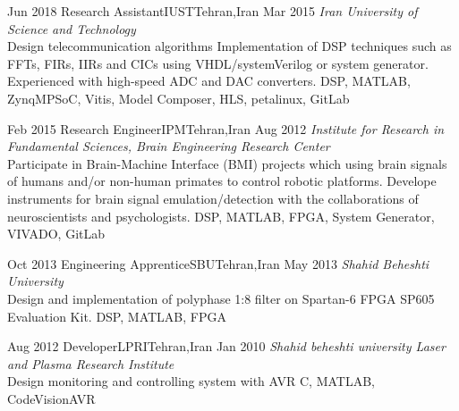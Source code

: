 
\begin{experiences}
  \experience
  {Jun 2018} {Research Assistant}{IUST}{Tehran,Iran}
  {Mar 2015} {
    \emph{Iran University of Science and Technology}\\
    Design telecommunication algorithms
    Implementation of DSP techniques such as FFTs, FIRs,
    IIRs and CICs using VHDL/systemVerilog or system generator.
    Experienced with high-speed ADC and DAC converters.
  }
  {DSP, MATLAB, ZynqMPSoC, Vitis, Model Composer, HLS, petalinux, GitLab}

  \emptySeparator

  \experience
  {Feb 2015} {Research Engineer}{IPM}{Tehran,Iran}
  {Aug 2012} {
    \emph{Institute for Research in Fundamental Sciences, Brain Engineering Research Center}\\
    Participate in Brain-Machine Interface (BMI) projects which using brain signals of humans
    and/or non-human primates to control robotic platforms. Develope instruments for brain
    signal emulation/detection with the collaborations of neuroscientists and psychologists.
  }
  {DSP, MATLAB, FPGA, System Generator, VIVADO, GitLab}

  \emptySeparator

  \experience
  {Oct 2013} {Engineering Apprentice}{SBU}{Tehran,Iran}
  {May 2013} {
    \emph{Shahid Beheshti University}\\
    Design and implementation of polyphase 1:8 filter on Spartan-6 FPGA SP605 Evaluation Kit.
  }
  {DSP, MATLAB, FPGA}

  \emptySeparator

  \experience
  {Aug 2012} {Developer}{LPRI}{Tehran,Iran}
  {Jan 2010} {
    \emph{Shahid beheshti university Laser and Plasma Research Institute}\\
    Design  monitoring and controlling system with AVR
  }
  {C, MATLAB, CodeVisionAVR}
\end{experiences}
